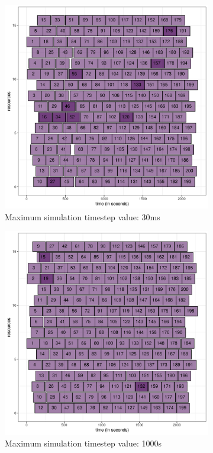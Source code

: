 \begin{figure}
	\begin{subfigure}{0.5\textwidth}
		\centering
		\includegraphics[width=\textwidth]{../imgs/max-timestep_30ms_gantt.png}
		\caption{Maximum simulation timestep value: 30ms}
		\label{fig:timestep_5ms}
	\end{subfigure}
	\begin{subfigure}{0.5\textwidth}
		\centering
		\includegraphics[width=\textwidth]{../imgs/max-timestep_1000s_gantt.png}
		\caption{Maximum simulation timestep value: 1000s}
		\label{fig:timesteap_50ms}
	\end{subfigure}

	\caption{}
	\label{fig:timestep_overlap}
\end{figure}

